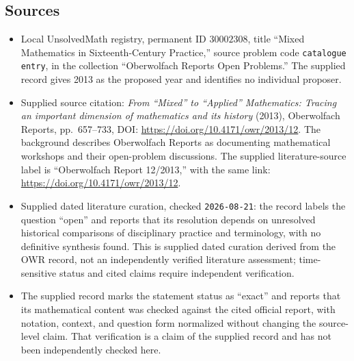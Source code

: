 \documentclass[11pt]{article}
\begin{document}
\subsection{Sources}
\begin{itemize}
\item Local UnsolvedMath registry, permanent ID \(30002308\), title ``Mixed Mathematics in Sixteenth-Century Practice,'' source problem code \texttt{catalogue entry}, in the collection ``Oberwolfach Reports Open Problems.'' The supplied record gives 2013 as the proposed year and identifies no individual proposer.
\item Supplied source citation: \emph{From ``Mixed'' to ``Applied'' Mathematics: Tracing an important dimension of mathematics and its history} (2013), Oberwolfach Reports, pp.~657--733, DOI: \url{https://doi.org/10.4171/owr/2013/12}. The background describes Oberwolfach Reports as documenting mathematical workshops and their open-problem discussions. The supplied literature-source label is ``Oberwolfach Report 12/2013,'' with the same link: \url{https://doi.org/10.4171/owr/2013/12}.
\item Supplied dated literature curation, checked \texttt{2026-08-21}: the record labels the question ``open'' and reports that its resolution depends on unresolved historical comparisons of disciplinary practice and terminology, with no definitive synthesis found. This is supplied dated curation derived from the OWR record, not an independently verified literature assessment; time-sensitive status and cited claims require independent verification.
\item The supplied record marks the statement status as ``exact'' and reports that its mathematical content was checked against the cited official report, with notation, context, and question form normalized without changing the source-level claim. That verification is a claim of the supplied record and has not been independently checked here.
\end{itemize}
\end{document}
